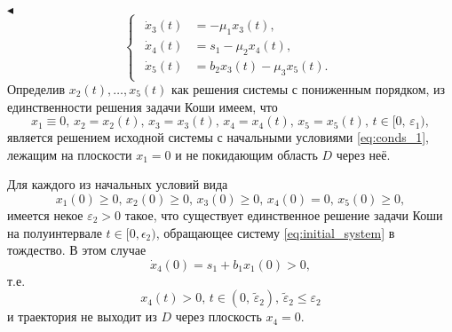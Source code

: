 \documentclass[12pt,a4paper]{extarticle}
\renewenvironment{proof}{\noindent$\blacktriangleleft$}{}
\theoremstyle{definition}
\theoremstyle{definition}
\theoremstyle{definition}
\begin{document}
\begin{proof}
\begin{equation*}
\begin{cases}
\begin{aligned}
					\dot{x}_3(t) &= -\mu_1x_3(t),\\
					\dot{x}_4(t) &= s_1 - \mu_2x_4(t),\\
					\dot{x}_5(t) &= b_2x_3(t)-\mu_3x_5(t).
				\end{aligned}
			\end{cases}
		\end{equation*} 
		Определив $x_2(t),\dots,x_5(t)$ как решения системы с пониженным порядком, из единственности решения задачи Коши имеем, что
		\[x_1\equiv0,\, x_2=x_2(t),\, x_3=x_3(t),\, x_4=x_4(t),\, x_5=x_5(t),\, t\in[0,\,\varepsilon_1),\]
		является решением исходной системы с начальными условиями \ref{eq:conds_1}, лежащим на плоскости $x_1=0$ и не покидающим область $D$ через неё.
		
		
		
		Для каждого из начальных условий вида
		\begin{equation*}
			x_1(0)\ge0,\, x_2(0)\ge0,\, x_3(0)\ge0,\, x_4(0)=0,\, x_5(0)\ge0,
		\end{equation*}
		имеется некое $\varepsilon_2>0$ такое, что существует единственное решение задачи Коши на полуинтервале $t\in[0,\epsilon_2)$, обращающее систему \ref{eq:initial_system} в тождество. В этом случае 
		\[\dot{x}_4(0)=s_1+b_1x_1(0)>0,\]
		т.е. 
		\[x_4(t)>0,\, t\in(0,\, \tilde{\varepsilon}_2),\,\tilde{\varepsilon}_2\le\varepsilon_2\]
		и траектория не выходит из $D$ через плоскость $x_4=0$.
		
		

\end{proof}
\end{document}
